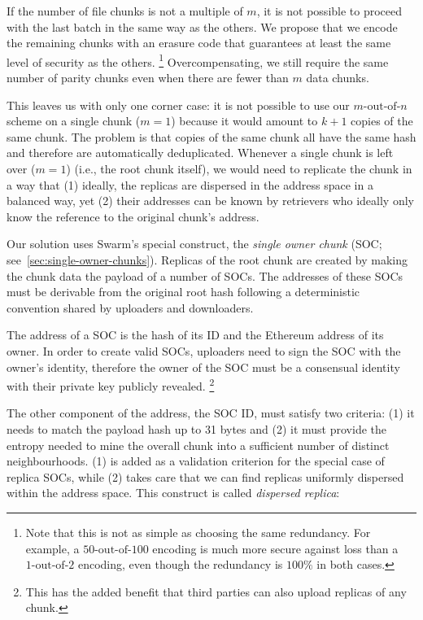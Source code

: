If the number of file chunks is not a multiple of $m$, it is not possible to proceed with the last batch in the same way as the others. We propose that we encode the remaining chunks with an erasure code that guarantees at least the same level of security as the others.%
%
\footnote{Note that this is not as simple as choosing the same redundancy. For example, a $50\text{-out-of-}100$ encoding is much more secure against loss than a $1\text{-out-of-}2$ encoding, even though the redundancy is $100\%$ in both cases.} 
%
Overcompensating, we still require the same number of parity chunks even when there are fewer than $m$ data chunks.

This leaves us with only one corner case: it is not possible to use our $m\text{-out-of-}n$ scheme on a single chunk ($m=1$) because it would amount to $k+1$ copies of the same chunk. The problem is that copies of the same chunk all have the same hash and therefore are automatically deduplicated. Whenever a single chunk is left over ($m=1$) (i.e., the root chunk itself), we would need to replicate the chunk in a way that (1) ideally, the replicas are dispersed in the address space in a balanced way, yet (2) their addresses can be known by retrievers who ideally only know the reference to the original chunk's address.

 
Our solution uses Swarm's special construct,  the \emph{single owner chunk} (SOC; see~\ref{sec:single-owner-chunks}). Replicas of the root chunk are created by making the chunk data the payload of a number of SOCs. The addresses of these SOCs must be derivable from the original root hash following a deterministic convention shared by uploaders and downloaders.

The address of a SOC is the hash of its ID and the Ethereum address of its owner. In order to create valid SOCs, uploaders need to sign the SOC with the owner's identity, therefore the owner of the SOC must be a consensual identity with their private key publicly revealed.
%
\footnote{This has the added benefit that third parties can also upload replicas of any chunk.}

The other component of the address, the SOC ID, must satisfy two criteria: (1) it needs to match the payload hash up to 31 bytes and (2) it must provide the entropy needed to mine the overall chunk into a sufficient number of distinct neighbourhoods. (1) is added as a validation criterion for the special case of replica SOCs, while (2) takes care that we can find replicas uniformly dispersed within the address space.
This construct is called \emph{dispersed replica}:

